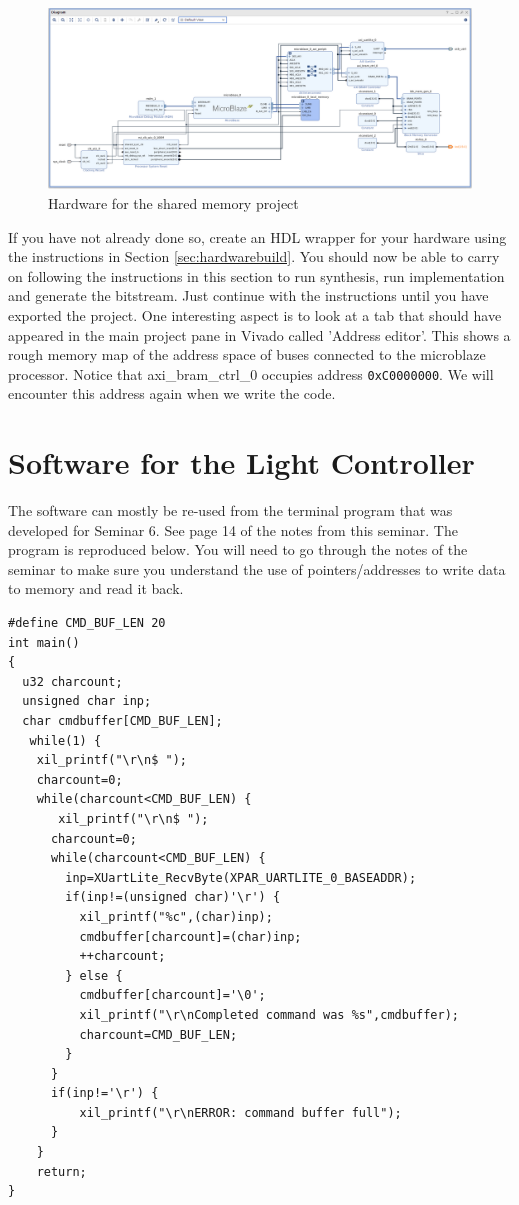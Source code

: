 \documentclass[../physical_computing.tex]{subfiles}
\begin{document}
\begin{figure}
\centering
\includegraphics[width=18cm]{figures/sharedmemoryhardware.png}
\caption{Hardware for the shared memory project}
\label{fig:sharedmemoryhardware}
\end{figure}

If you have not already done so, create an HDL wrapper for your hardware using the instructions in Section 
\ref{sec:hardwarebuild}. You should now be able to carry on following the instructions in this section to 
run synthesis, run implementation and generate the bitstream. Just continue with the instructions until you 
have exported the project. One interesting aspect is to look at a tab that should have appeared in the main 
project pane in Vivado called 'Address editor'. This shows a rough memory map of the address space of buses
connected to the microblaze processor. Notice that axi\_bram\_ctrl\_0 occupies address \texttt{0xC0000000}. We
will encounter this address again when we write the code.

\section{Software for the Light Controller}
\label{sec:lightcontrolsoftware}

The software can mostly be re-used from the terminal program that was developed for Seminar 6. See page 14 of
the notes from this seminar. The program is reproduced below. You will need to go through the notes of the seminar
to make sure you understand the use of pointers/addresses to write data to memory and read it back. 

\begin{verbatim}
#define CMD_BUF_LEN 20
int main()
{
  u32 charcount;
  unsigned char inp;
  char cmdbuffer[CMD_BUF_LEN];
   while(1) {
    xil_printf("\r\n$ ");
    charcount=0;
    while(charcount<CMD_BUF_LEN) {
       xil_printf("\r\n$ ");
	  charcount=0;
	  while(charcount<CMD_BUF_LEN) {
		inp=XUartLite_RecvByte(XPAR_UARTLITE_0_BASEADDR);
		if(inp!=(unsigned char)'\r') {
		  xil_printf("%c",(char)inp);
		  cmdbuffer[charcount]=(char)inp;
		  ++charcount;
		} else {
		  cmdbuffer[charcount]='\0';
		  xil_printf("\r\nCompleted command was %s",cmdbuffer);
		  charcount=CMD_BUF_LEN;
		}
	  }
	  if(inp!='\r') {
		  xil_printf("\r\nERROR: command buffer full");
	  }
	}
    return;
}
\end{verbatim}
\end{document}

